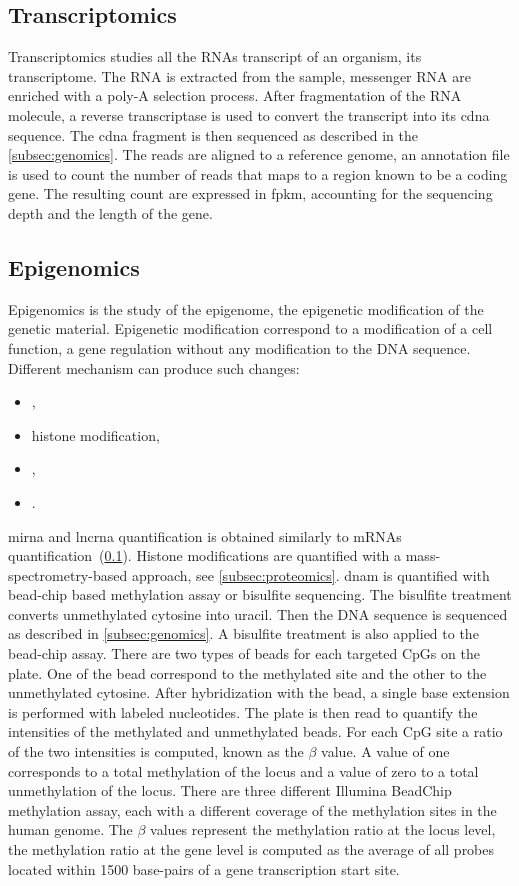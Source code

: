 \documentclass[../main.tex]{subfiles}
\begin{document}
 \subsection{Transcriptomics}\label{subsec:transcriptomics}
	 Transcriptomics studies all the RNAs transcript of an organism, \ie{}its transcriptome.
	 The RNA is extracted from the sample, messenger RNA are enriched with a poly-A selection process.
	 After fragmentation of the RNA molecule, a reverse transcriptase is used to convert the transcript into its \gls{cdna} sequence.
	 The \gls{cdna} fragment is then sequenced as described in the \cref{subsec:genomics}.
	 The reads are aligned to a reference genome, an annotation file is used to count the number of reads that maps to a region known to be a coding gene.
	 The resulting count are expressed in \gls{fpkm}, accounting for the sequencing depth and the length of the gene.

 \subsection{Epigenomics}
	 Epigenomics is the study of the epigenome, the epigenetic modification of the genetic material.
	 Epigenetic modification correspond to a modification of a cell function, a gene regulation without any modification to the DNA sequence.
	 Different mechanism can produce such changes:
	 \begin{itemize}[nosep]
		 \item {},
		 \item histone modification,
		 \item {},
		 \item {}.
	 \end{itemize}
	 \Gls{mirna} and \gls{lncrna} quantification is obtained similarly to mRNAs quantification~(\cref{subsec:transcriptomics}).
	 Histone modifications are quantified with a mass-spectrometry-based approach, see \cref{subsec:proteomics}.
	 \Gls{dnam} is quantified with bead-chip based methylation assay or bisulfite sequencing.
	 The bisulfite treatment converts unmethylated cytosine into uracil.
	 Then the DNA sequence is sequenced as described in \cref{subsec:genomics}.
	 A bisulfite treatment is also applied to the bead-chip assay.
	 There are two types of beads for each targeted CpGs on the plate.
	 One of the bead correspond to the methylated site and the other to the unmethylated cytosine.
	 After hybridization with the bead, a single base extension is performed with labeled nucleotides.
	 The plate is then read to quantify the intensities of the methylated and unmethylated beads.
	 For each CpG site a ratio of the two intensities is computed, known as the \(\beta\) value.
	 A value of one corresponds to a total methylation of the locus and a value of zero to a total unmethylation of the locus.
	 There are three different Illumina BeadChip methylation assay, each with a different coverage of the methylation sites in the human genome.
	 The \(\beta\) values represent the methylation ratio at the locus level, the methylation ratio at the gene level is computed as the average of all probes located within 1500 base-pairs of a gene transcription start site.
\end{document}
